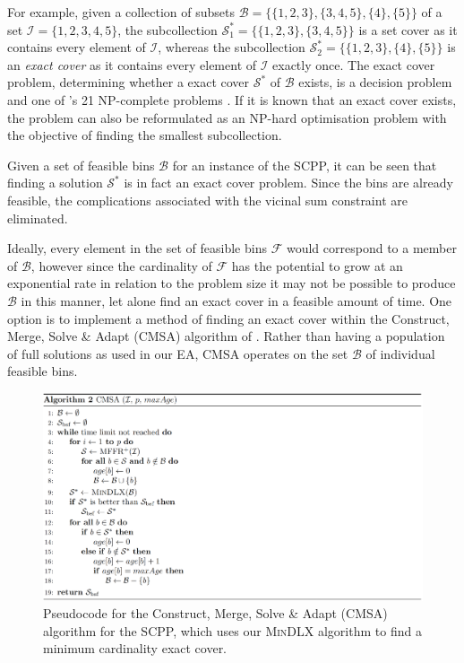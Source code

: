 \documentclass[authoryear]{elsarticle}
\begin{document}
\noindent For example, given a collection of subsets $\mathcal{B} = \{\{1,2,3\}, \{3,4,5\}, \{4\}, \{5\}\}$ of a set $\mathcal{I} = \{1,2,3,4,5\}$, the subcollection $\mathcal{S}^*_1 = \{\{1,2,3\}, \{3,4,5\}\}$ is a set cover as it contains every element of $\mathcal{I}$, whereas the subcollection $\mathcal{S}^*_2 = \{\{1,2,3\}, \{4\}, \{5\}\}$ is an \emph{exact cover} as it contains every element of $\mathcal{I}$ exactly once. The exact cover problem, determining whether a exact cover $\mathcal{S}^*$ of $\mathcal{B}$ exists, is a decision problem and one of \citeauthor{karp1972}'s 21 NP-complete problems \citeyearpar{karp1972}. If it is known that an exact cover exists, the problem can also be reformulated as an NP-hard optimisation problem with the objective of finding the smallest subcollection.

Given a set of feasible bins $\mathcal{B}$ for an instance of the SCPP, it can be seen that finding a solution $\mathcal{S}^*$ is in fact an exact cover problem. Since the bins are already feasible, the complications associated with the vicinal sum constraint are eliminated.

Ideally, every element in the set of feasible bins $\mathcal{F}$ would correspond to a member of $\mathcal{B}$, however since the cardinality of $\mathcal{F}$ has the potential to grow at an exponential rate in relation to the problem size it may not be possible to produce $\mathcal{B}$ in this manner, let alone find an exact cover in a feasible amount of time. One option is to implement a method of finding an exact cover within the Construct, Merge, Solve \& Adapt (CMSA) algorithm of \citet{blum2016}. Rather than having a population of full solutions as used in our EA, CMSA operates on the set $\mathcal{B}$ of individual feasible bins.

\begin{figure}[h!]	
	\centering
	\includegraphics[width=\textwidth]{figures/AlgCMSA}
	\caption{Pseudocode for the Construct, Merge, Solve \& Adapt (CMSA) algorithm for the SCPP, which uses our \textsc{MinDLX} algorithm to find a minimum cardinality exact cover.}	
	\label{fig:algcmsa}
\end{figure}
\end{document}
